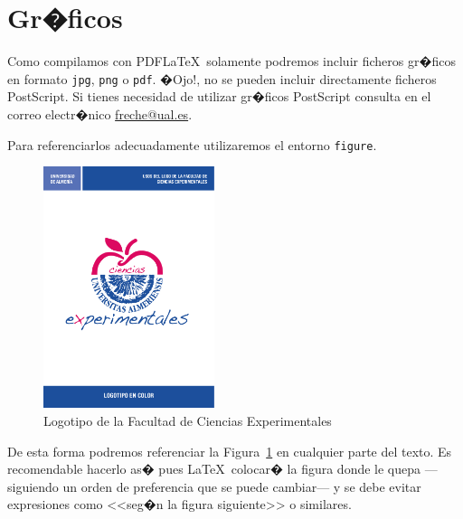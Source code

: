 \documentclass[a4paper,12pt,%
]{memoir}
\begin{document}
\section{Gr�ficos}
Como compilamos con PDF\LaTeX\ solamente podremos incluir ficheros
gr�ficos en formato \texttt{jpg}, \texttt{png} o \texttt{pdf}. �Ojo!,
no se pueden incluir directamente ficheros PostScript. Si tienes
necesidad de utilizar gr�ficos PostScript consulta en el correo
electr�nico \url{freche@ual.es}.
\par
Para referenciarlos adecuadamente utilizaremos el entorno
\texttt{figure}.
\begin{figure}[h]
  \centering 
  \includegraphics[width=5cm]{./imagenes/logo_facultad.pdf}
  \caption{Logotipo de la Facultad de Ciencias Experimentales}
  \label{fig:logo}
\end{figure}
\par
De esta forma podremos referenciar la Figura~\ref{fig:logo} en
cualquier parte del texto. Es recomendable hacerlo as� pues \LaTeX\
colocar� la figura donde le quepa ---siguiendo un orden de preferencia
que se puede cambiar--- y se debe evitar expresiones como <<seg�n la
figura siguiente>> o similares.
\end{document}

